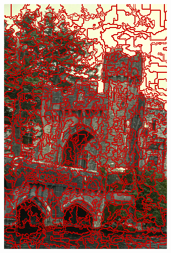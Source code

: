 \begin{figure}
{		\includegraphics[scale=\scalefivebsdtest]{pictures/bsd-test-5-reseeds}
	}
	\subfigure{
}
\end{figure}
